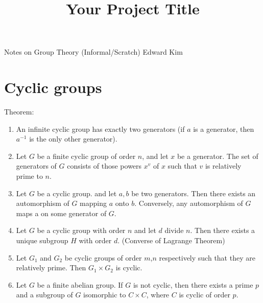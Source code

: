 \documentclass[12pt]{article}
\title{Your Project Title}
\begin{document}
Notes on Group Theory (Informal/Scratch)
Edward Kim

\hrulefill

\section*{Cyclic groups}

Theorem: 
\begin{enumerate}
\item An infinite cyclic group has exactly two generators (if $a$ is a generator, then $a^{-1}$ is the only other generator).
\item Let $G$ be a finite cyclic group of order $n$, and let $x$ be a generator. The set of generators of $G$ consists of those powers $x^v$ of $x$ such that $v$ is relatively prime to $n$.
\item Let $G$ be a cyclic group. and let $a,b$ be two generators. Then there exists an automorphism of $G$ mapping $a$ onto $b$. Conversely, any automorphism of $G$ maps a on some generator of $G$.
\item Let $G$ be a cyclic group with order $n$ and let $d$ divide $n$. Then there exists a unique subgroup $H$ with order $d$. (Converse of Lagrange Theorem)
\item Let $G_1$ and $G_2$ be cyclic groups of order $m$,$n$ respectively such that they are relatively prime. Then $G_1 \times G_2$ is cyclic. 
\item Let $G$ be a finite abelian group. If $G$ is not cyclic, then there exists a prime $p$ and a subgroup of $G$ isomorphic to $C \times C$, where $C$ is cyclic of order $p$.
\end{enumerate}
\end{document}
